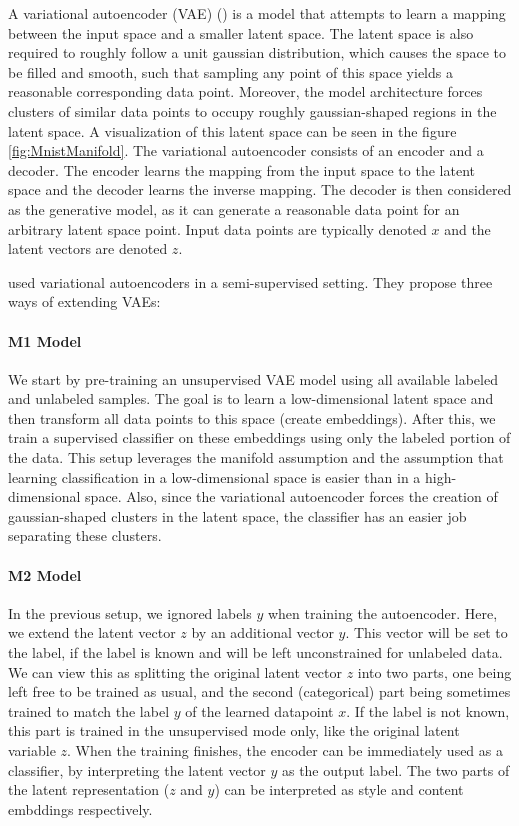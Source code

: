 A variational autoencoder (VAE) (\cite{VariationalAutoencoder}) is a model that attempts to learn a mapping between the input space and a smaller latent space. The latent space is also required to roughly follow a unit gaussian distribution, which causes the space to be filled and smooth, such that sampling any point of this space yields a reasonable corresponding data point. Moreover, the model architecture forces clusters of similar data points to occupy roughly gaussian-shaped regions in the latent space. A visualization of this latent space can be seen in the figure \ref{fig:MnistManifold}. The variational autoencoder consists of an encoder and a decoder. The encoder learns the mapping from the input space to the latent space and the decoder learns the inverse mapping. The decoder is then considered as the generative model, as it can generate a reasonable data point for an arbitrary latent space point. Input data points are typically denoted $x$ and the latent vectors are denoted $z$.

\cite{KingmaSslVae} used variational autoencoders in a semi-supervised setting. They propose three ways of extending VAEs:

\paragraph*{M1 Model}
We start by pre-training an unsupervised VAE model using all available labeled and unlabeled samples. The goal is to learn a low-dimensional latent space and then transform all data points to this space (create embeddings). After this, we train a supervised classifier on these embeddings using only the labeled portion of the data. This setup leverages the manifold assumption and the assumption that learning classification in a low-dimensional space is easier than in a high-dimensional space. Also, since the variational autoencoder forces the creation of gaussian-shaped clusters in the latent space, the classifier has an easier job separating these clusters.

\paragraph*{M2 Model}
In the previous setup, we ignored labels $y$ when training the autoencoder. Here, we extend the latent vector $z$ by an additional vector $y$. This vector will be set to the label, if the label is known and will be left unconstrained for unlabeled data. We can view this as splitting the original latent vector $z$ into two parts, one being left free to be trained as usual, and the second (categorical) part being sometimes trained to match the label $y$ of the learned datapoint $x$. If the label is not known, this part is trained in the unsupervised mode only, like the original latent variable $z$. When the training finishes, the encoder can be immediately used as a classifier, by interpreting the latent vector $y$ as the output label. The two parts of the latent representation ($z$ and $y$) can be interpreted as style and content embddings respectively.

